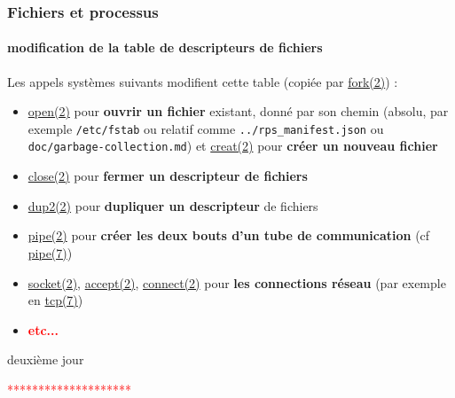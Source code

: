 \documentclass[xcolor=svgnames,final,smaller,a4]{beamer}
\begin{document}
\begin{frame}
  \frametitle{Fichiers et processus}
  \framesubtitle{modification de la table de descripteurs de fichiers}


  
  Les appels systèmes suivants modifient cette table (copiée par
  \href{https://man7.org/linux/man-pages/man2/fork.2.html}{fork(2)}) :

  \begin{itemize}
    \item 
  \href{https://man7.org/linux/man-pages/man2/open.2.html}{open(2)} pour \textbf{ouvrir un fichier} existant, donné par son chemin (absolu, par exemple \texttt{/etc/fstab} ou relatif comme \texttt{../rps\_manifest.json} ou \texttt{doc/garbage-collection.md}) et 
  \href{https://man7.org/linux/man-pages/man2/creat.2.html}{creat(2)} pour  \textbf{créer un nouveau fichier}

  \item 
  \href{https://man7.org/linux/man-pages/man2/close.2.html}{close(2)} pour  \textbf{fermer un descripteur de fichiers}

\item
  \href{https://man7.org/linux/man-pages/man2/dup2.2.html}{dup2(2)}
  pour  \textbf{dupliquer un descripteur} de fichiers

\item 
  \href{https://man7.org/linux/man-pages/man2/pipe.2.html}{pipe(2)}
  pour  \textbf{créer les deux bouts d'un tube de communication} (cf
  \href{https://man7.org/linux/man-pages/man7/pipe.7.html}{pipe(7)})
  
    \item 
  \href{https://man7.org/linux/man-pages/man2/socket.2.html}{socket(2)},
  \href{https://man7.org/linux/man-pages/man2/accept.2.html}{accept(2)},
  \href{https://man7.org/linux/man-pages/man2/accept.2.html}{connect(2)} pour  \textbf{les connections réseau} (par exemple en
  \href{https://man7.org/linux/man-pages/man7/tcp.7.html}{tcp(7)})
    \item \textbf{\textcolor{red}{etc...}}
  \end{itemize}

    
\end{frame}

\begin{frame}
  {\Large deuxième jour}

  \vspace{0.5cm}
  \textcolor{red}{\Large *********************}
  
  \vspace{0.5cm}
  
   \tableofcontents
\end{frame}
\end{document}

